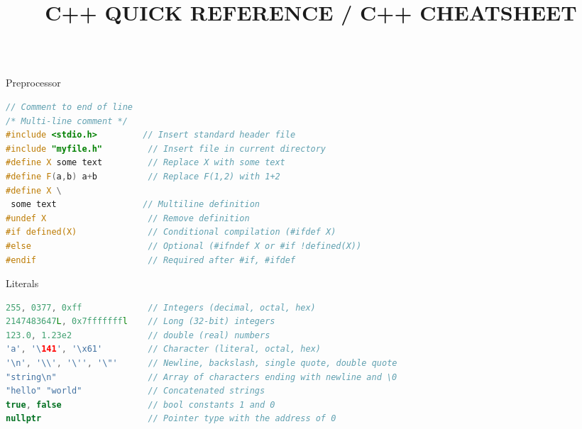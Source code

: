 \documentclass[final]{beamer}
\title{C++ QUICK REFERENCE / C++ CHEATSHEET}
\begin{document}
\begin{frame}[t,fragile]

\begin{columns}[t,totalwidth=\paperwidth, colsep=0.015\paperwidth]

\begin{column}{0.32\paperwidth}

\begin{block}{Preprocessor}
\begin{lstlisting}[language=C++]
// Comment to end of line
/* Multi-line comment */
#include <stdio.h>         // Insert standard header file
#include "myfile.h"         // Insert file in current directory
#define X some text         // Replace X with some text
#define F(a,b) a+b          // Replace F(1,2) with 1+2
#define X \
 some text                 // Multiline definition
#undef X                    // Remove definition
#if defined(X)              // Conditional compilation (#ifdef X)
#else                       // Optional (#ifndef X or #if !defined(X))
#endif                      // Required after #if, #ifdef
\end{lstlisting}
\end{block}



\begin{block}{Literals}
\begin{lstlisting}[language=C++]
255, 0377, 0xff             // Integers (decimal, octal, hex)
2147483647L, 0x7fffffffl    // Long (32-bit) integers
123.0, 1.23e2               // double (real) numbers
'a', '\141', '\x61'         // Character (literal, octal, hex)
'\n', '\\', '\'', '\"'      // Newline, backslash, single quote, double quote
"string\n"                  // Array of characters ending with newline and \0
"hello" "world"             // Concatenated strings
true, false                 // bool constants 1 and 0
nullptr                     // Pointer type with the address of 0
\end{lstlisting}
\end{block}



\end{column}
\end{columns}
\end{frame}
\end{document}
